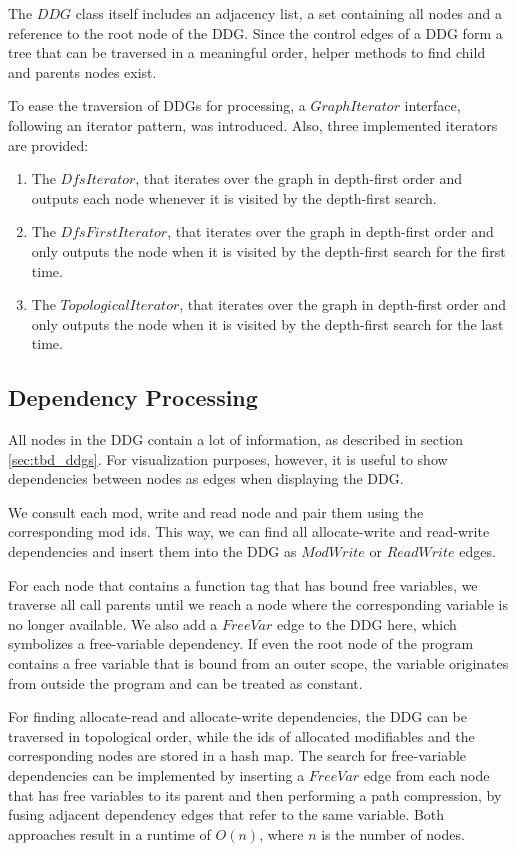 The $DDG$ class itself includes an adjacency list, a set containing all nodes and a reference to the root node of the DDG. Since the control edges of a DDG form a tree that can be traversed in a meaningful order, helper methods to find child and parents nodes exist. 

To ease the traversion of DDGs for processing, a $GraphIterator$ interface, following an iterator pattern, was introduced. Also, three implemented iterators are provided: 

\begin{enumerate}
\item The $DfsIterator$, that iterates over the graph in depth-first order and outputs each node whenever it is visited by the depth-first search. 
\item The $DfsFirstIterator$, that iterates over the graph in depth-first order and only outputs the node when it is visited by the depth-first search for the first time.
\item The $TopologicalIterator$, that iterates over the graph in depth-first order and only outputs the node when it is visited by the depth-first search for the last time.  
\end{enumerate}

\subsection{Dependency Processing}

All nodes in the DDG contain a lot of information, as described in section \ref{sec:tbd_ddgs}. For visualization purposes, however, it is useful to show dependencies between nodes as edges when displaying the DDG. 

We consult each mod, write and read node and pair them using the corresponding mod ids. This way, we can find all allocate-write and read-write dependencies and insert them into the DDG as $ModWrite$ or $ReadWrite$ edges.

For each node that contains a function tag that has bound free variables, we traverse all call parents until we reach a node where the corresponding variable is no longer available. We also add a $FreeVar$ edge to the DDG here, which symbolizes a free-variable dependency. If even the root node of the program contains a free variable that is bound from an outer scope, the variable originates from outside the program and can be treated as constant. 

For finding allocate-read and allocate-write dependencies, the DDG can be traversed in topological order, while the ids of allocated modifiables and the corresponding nodes are stored in a hash map. The search for free-variable dependencies can be implemented by inserting a $FreeVar$ edge from each node that has free variables to its parent and then performing a path compression, by fusing adjacent dependency edges that refer to the same variable. Both approaches result in a runtime of $O(n)$, where $n$ is the number of nodes.

